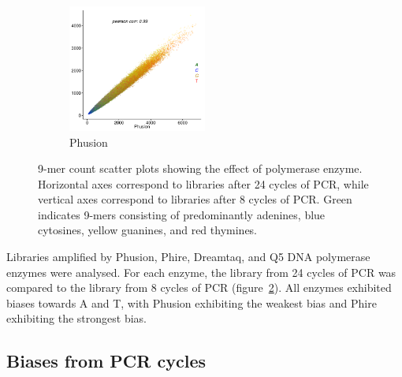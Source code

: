 \documentclass[parskip=full, numbers=noenddot]{scrreprt}
\begin{document}
\begin{figure}[htpb]
  \begin{subfigure}[htpb]{0.5\textwidth}
    \centering
    \includegraphics[width=0.5\textwidth]{kmer_phusion}
    \caption{Phusion}
    \label{fig:kmer_enz_phusion}
  \end{subfigure}
  \caption{9-mer count scatter plots showing the effect of polymerase enzyme.  Horizontal axes correspond to libraries after 24 cycles of PCR, while vertical axes correspond to libraries after 8 cycles of PCR.  Green indicates 9-mers consisting of predominantly adenines, blue cytosines, yellow guanines, and red thymines.}
  \label{fig:kmer_enz}
\end{figure}

Libraries amplified by Phusion, Phire, Dreamtaq, and Q5 DNA polymerase enzymes were analysed.  For each enzyme, the library from 24 cycles of PCR was compared to the library from 8 cycles of PCR (figure~\ref{fig:kmer_enz}).  All enzymes exhibited biases towards A and T, with Phusion exhibiting the weakest bias and Phire exhibiting the strongest bias.

\subsection{Biases from PCR cycles}
\label{ssec:pcrbias_result_pcr}


\end{document}
